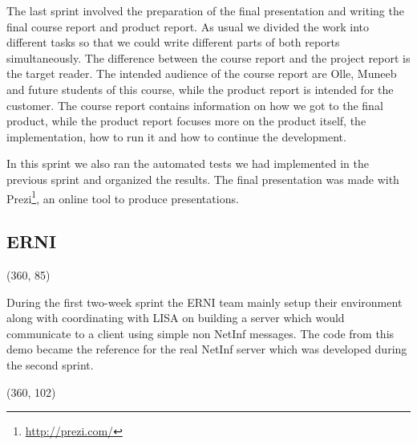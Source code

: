 The last sprint involved the preparation of the final presentation and writing the final course report and
product report. As usual we divided the work into different tasks so that we could write different parts
of both reports simultaneously. The difference between the course report
and the project report is the target reader. The intended audience of the course report are Olle, Muneeb and future students
of this course, while the product report is intended for the customer. The course report contains information
on how we got to the final product, while the product report focuses more on the product itself, the implementation,
how to run it and how to continue the development.

In this sprint we also ran the automated tests we had implemented in the previous sprint and organized the results. The final presentation was made with Prezi\footnote{\url{http://prezi.com/}}, an online tool to produce presentations.

\subsection {ERNI}

\framebox(360, 85){
}

During the first two-week sprint the ERNI team mainly setup their environment along with coordinating with LISA on building a server which would communicate to a client using simple non NetInf messages. The code from this demo became the reference for the real NetInf server which was developed during the second sprint.

\framebox(360, 102){
}

